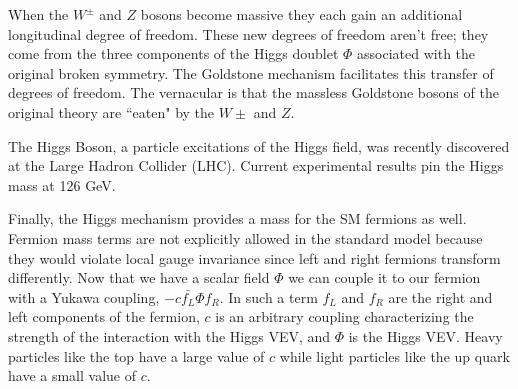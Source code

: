 When the $W^\pm$ and $Z$ bosons become massive they each gain an additional longitudinal degree of freedom.
These new degrees of freedom aren't free; they come from the three components of the Higgs doublet $\Phi$ associated with the original broken symmetry.
The Goldstone mechanism facilitates this transfer of degrees of freedom.
The vernacular is that the massless Goldstone bosons of the original theory are ``eaten" by the $W\pm$ and $Z$.

The Higgs Boson, a particle excitations of the Higgs field, was recently discovered at the Large Hadron Collider (LHC).
Current experimental results pin the Higgs mass at 126 GeV.

Finally, the Higgs mechanism provides a mass for the SM fermions as well.
Fermion mass terms are not explicitly allowed in the standard model because they would violate local gauge invariance since left and right fermions transform differently.
Now that we have a scalar field $\Phi$ we can couple it to our fermion with a Yukawa coupling, $-c\bar{f_L}\Phi f_R$.
In such a term $f_L$ and $f_R$ are the right and left components of the fermion, $c$ is an arbitrary coupling characterizing the strength of the interaction with the Higgs VEV, and $\Phi$ is the Higgs VEV.
Heavy particles like the top have a large value of $c$ while light particles like the up quark have a small value of $c$.




